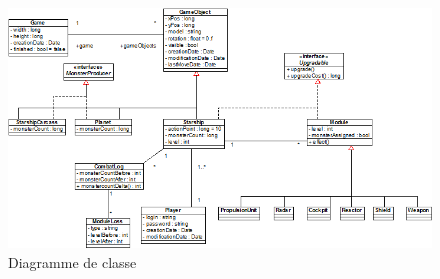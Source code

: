 \documentclass[a4paper,11pt]{report}
\begin{document}
        \begin{figure}[H]
            \begin{center}
                \includegraphics[width=\textwidth]{cls_diag/class_diagram.png}
                \caption{Diagramme de classe}
                \label{fig:classe}
            \end{center}
        \end{figure}
\end{document}
